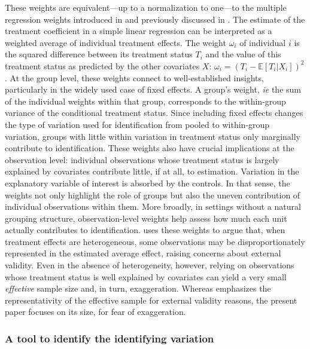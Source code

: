 \documentclass[usletter, 12pt]{article}
\begin{document}
				These weights are equivalent---up to a normalization to one---to the multiple regression weights introduced in \cite{aronow_does_2016} and previously discussed in \cite{angrist_mostly_2009}. %
				The estimate of the treatment coefficient in a simple linear regression can be interpreted as a weighted average of individual treatment effects. The weight $\omega_{i}$ of individual $i$ is the squared difference between its treatment status $T_{i}$ and the value of this treatment status as predicted by the other covariates $X$: $\omega_{i} = (T_{i} - \mathbb{E}[T_{i} | X_{i}])^{2}$. %
				At the group level, these weights connect to well-established insights, particularly in the widely used case of fixed effects. A group’s weight, \textit{ie} the sum of the individual weights within that group, corresponds to the within-group variance of the conditional treatment status. Since including fixed effects changes the type of variation used for identification from pooled to within-group variation, groups with little within variation in treatment status only marginally contribute to identification. 
				These weights also have crucial implications at the observation level: individual observations whose treatment status is largely explained by covariates contribute little, if at all, to estimation. Variation in the explanatory variable of interest is absorbed by the controls. In that sense, the weights not only highlight the role of groups but also the uneven contribution of individual observations within them. More broadly, in settings without a natural grouping structure, observation-level weights help assess how much each unit actually contributes to identification. 
				\cite{aronow_does_2016} uses these weights to argue that, when treatment effects are heterogeneous, some observations may be disproportionately represented in the estimated average effect, raising concerns about external validity. Even in the absence of heterogeneity, however, relying on observations whose treatment status is well explained by covariates can yield a very small \textit{effective} sample size and, in turn, exaggeration. Whereas \cite{aronow_does_2016} emphasizes the representativity of the effective sample for external validity reasons, the present paper focuses on its size, for fear of exaggeration.
			
			\subsubsection{A tool to identify the identifying variation}
			
\end{document}
